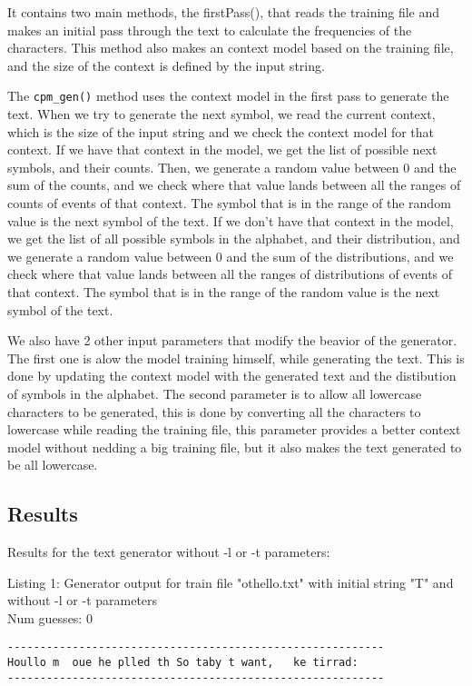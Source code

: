 \documentclass{article}
\begin{document}
It contains two main methods, the firstPass(), that reads the training file and makes an initial pass through the text to calculate the frequencies of the characters.
This method also makes an context model based on the training file, and the size of the context is defined by the input string. 

The \verb|cpm_gen()| method uses the context model in the first pass to generate the text.
When we try to generate the next symbol, we read the current context, which is the size of the input string and we check the context model for that context. If we have that context in the model, we get the list of possible next symbols, and their counts. Then, we generate a random value between 0 and the sum of the counts, and we check where that value lands between all the ranges of counts of events of that context. The symbol that is in the range of the random value is the next symbol of the text.
If we don't have that context in the model, we get the list of all possible symbols in the alphabet, and their distribution, and we generate a random value between 0 and the sum of the distributions, and we check where that value lands between all the ranges of distributions of events of that context. The symbol that is in the range of the random value is the next symbol of the text. 

We also have 2 other input parameters that modify the beavior of the generator. The first one is alow the model training himself, while generating the text. This is done by updating the context model with the generated text and the distibution of symbols in the alphabet.
The second parameter is to allow all lowercase characters to be generated, this is done by converting all the characters to lowercase while reading the training file, this parameter provides a better context model without nedding a big training file, but it also makes the text generated to be all lowercase.


\subsection{Results}


Results for the text generator without -l or -t parameters:

\hfill

Listing 1: Generator output for train file "othello.txt" with initial string "T" and without -l or -t parameters
\\Num guesses: 0

\begin{lstlisting}
----------------------------------------------------------
Houllo m  oue he plled th So taby t want,   ke tirrad:
----------------------------------------------------------
\end{lstlisting}
\end{document}
